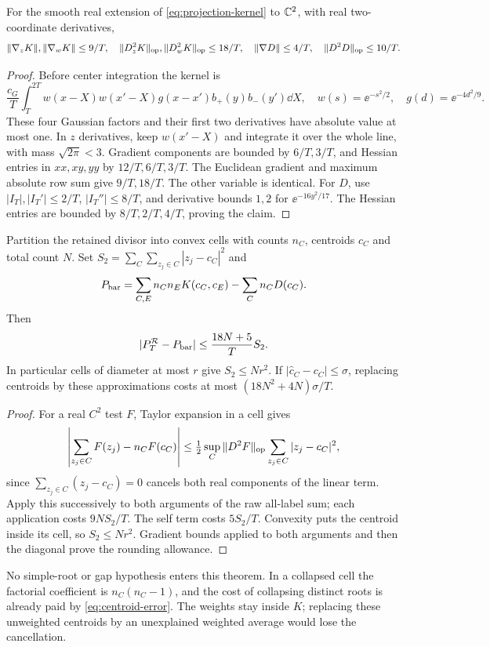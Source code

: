 \begin{lemma}\label{lem:kernel-derivatives}
For the smooth real extension of \eqref{eq:projection-kernel} to
$\mathbb C^2$, with real two-coordinate derivatives,
\[
 \|\nabla_zK\|,\|\nabla_wK\|\le9/T,\quad
 \|D_z^2K\|_{\rm op},\|D_w^2K\|_{\rm op}\le18/T,
 \quad\|\nabla D\|\le4/T,\quad\|D^2D\|_{\rm op}\le10/T.
\]
\end{lemma}
\begin{proof}
Before center integration the kernel is
\[
 \frac{c_G}{T}\int_T^{2T}w(x-X)w(x'-X)g(x-x')b_+(y)b_-(y')\dd X,
 \quad w(s)=\ee^{-s^2/2},\quad g(d)=\ee^{-4d^2/9}.
\]
These four Gaussian factors and their first two derivatives have
absolute value at most one. In $z$ derivatives, keep $w(x'-X)$
and integrate it over the whole line, with mass $\sqrt{2\pi}<3$.
Gradient components are bounded by $6/T,3/T$, and Hessian entries
in $xx,xy,yy$ by $12/T,6/T,3/T$. The Euclidean gradient and
maximum absolute row sum give $9/T,18/T$. The other variable is identical.
For $D$, use $|I_T|,|I_T'|\le2/T$, $|I_T''|\le8/T$,
and derivative bounds $1,2$ for $\ee^{-16y^2/17}$.
The Hessian entries are bounded by $8/T,2/T,4/T$, proving the claim.
\end{proof}

\begin{theorem}\label{thm:centroid}
Partition the retained divisor into convex cells with counts $n_C$,
centroids $c_C$ and total count $N$. Set
$S_2=\sum_C\sum_{z_j\in C}|z_j-c_C|^2$ and
\[
 P_{\rm bar}=\sum_{C,E}n_Cn_EK(c_C,c_E)-\sum_Cn_CD(c_C).
\]
Then
\begin{equation}\label{eq:centroid-error}
 |P_T^{\mathcal R}-P_{\rm bar}|\le\frac{18N+5}{T}S_2.
\end{equation}
In particular cells of diameter at most $r$ give
$S_2\le Nr^2$. If $|\widehat c_C-c_C|\le\sigma$, replacing
centroids by these approximations costs at most
$(18N^2+4N)\sigma/T$.
\end{theorem}
\begin{proof}
For a real $C^2$ test $F$, Taylor expansion in a cell gives
\[
 \left|\sum_{z_j\in C}F(z_j)-n_CF(c_C)\right|
 \le\tfrac12\sup_C\|D^2F\|_{\rm op}
                         \sum_{z_j\in C}|z_j-c_C|^2,
\]
since $\sum_{z_j\in C}(z_j-c_C)=0$ cancels both real components
of the linear term. Apply this successively to both arguments of the
raw all-label sum; each application costs $9NS_2/T$. The self term
costs $5S_2/T$. Convexity puts the centroid inside its cell, so
$S_2\le Nr^2$. Gradient bounds applied to both arguments and then
the diagonal prove the rounding allowance.
\end{proof}
No simple-root or gap hypothesis enters this theorem. In a collapsed
cell the factorial coefficient is $n_C(n_C-1)$, and the cost of
collapsing distinct roots is already paid by \eqref{eq:centroid-error}.
The weights stay inside $K$; replacing these unweighted centroids
by an unexplained weighted average would lose the cancellation.

